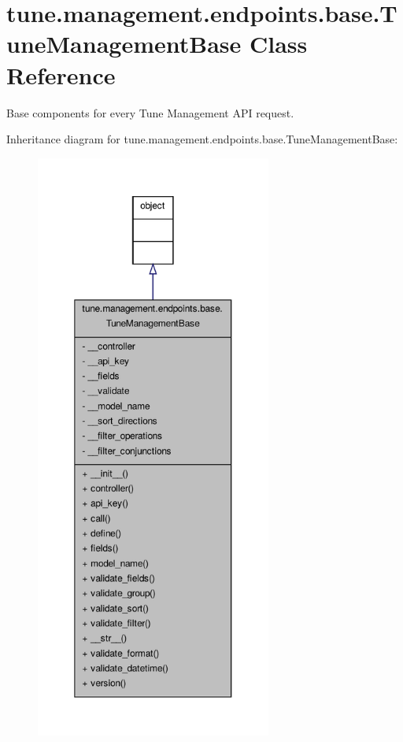 \hypertarget{classtune_1_1management_1_1endpoints_1_1base_1_1TuneManagementBase}{\section{tune.\-management.\-endpoints.\-base.\-Tune\-Management\-Base Class Reference}
\label{classtune_1_1management_1_1endpoints_1_1base_1_1TuneManagementBase}
}


Base components for every Tune Management A\-P\-I request.  




Inheritance diagram for tune.\-management.\-endpoints.\-base.\-Tune\-Management\-Base\-:
\nopagebreak
\begin{figure}[H]
\begin{center}
\leavevmode
\includegraphics[height=550pt]{classtune_1_1management_1_1endpoints_1_1base_1_1TuneManagementBase__inherit__graph}
\end{center}
\end{figure}


